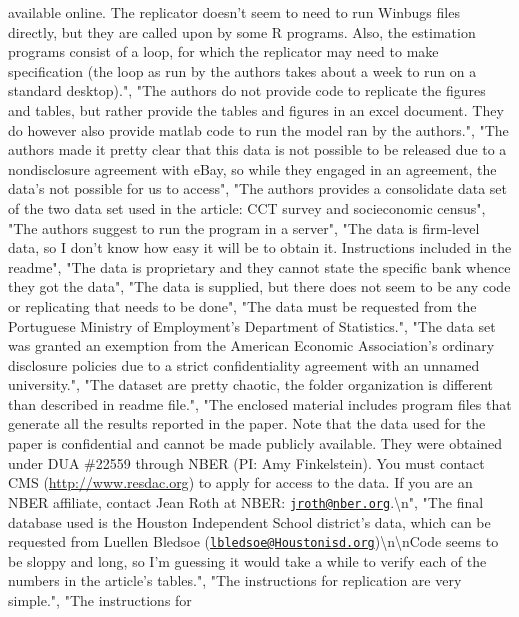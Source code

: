 \documentclass[]{article}
\begin{document}
\begin{itemize}
  available online. The replicator doesn't seem to need to run Winbugs
  files directly, but they are called upon by some R programs. Also, the
  estimation programs consist of a loop, for which the replicator may
  need to make specification (the loop as run by the authors takes about
  a week to run on a standard desktop).", "The authors do not provide
  code to replicate the figures and tables, but rather provide the
  tables and figures in an excel document. They do however also provide
  matlab code to run the model ran by the authors.", "The authors made
  it pretty clear that this data is not possible to be released due to a
  nondisclosure agreement with eBay, so while they engaged in an
  agreement, the data's not possible for us to access", "The authors
  provides a consolidate data set of the two data set used in the
  article: CCT survey and socieconomic census", "The authors suggest to
  run the program in a server", "The data is firm-level data, so I don't
  know how easy it will be to obtain it. Instructions included in the
  readme", "The data is proprietary and they cannot state the specific
  bank whence they got the data", "The data is supplied, but there does
  not seem to be any code or replicating that needs to be done", "The
  data must be requested from the Portuguese Ministry of Employment's
  Department of Statistics.", "The data set was granted an exemption
  from the American Economic Association's ordinary disclosure policies
  due to a strict confidentiality agreement with an unnamed
  university.", "The dataset are pretty chaotic, the folder organization
  is different than described in readme file.", "The enclosed material
  includes program files that generate all the results reported in the
  paper. Note that the data used for the paper is confidential and
  cannot be made publicly available. They were obtained under DUA
  \#22559 through NBER (PI: Amy Finkelstein). You must contact CMS
  (\url{http://www.resdac.org}) to apply for access to the data. If you
  are an NBER affiliate, contact Jean Roth at NBER:
  \href{mailto:jroth@nber.org}{\nolinkurl{jroth@nber.org}}.\textbackslash{}n",
  "The final database used is the Houston Independent School district's
  data, which can be requested from Luellen Bledsoe
  (\href{mailto:lbledsoe@Houstonisd.org}{\nolinkurl{lbledsoe@Houstonisd.org}})\textbackslash{}n\textbackslash{}nCode
  seems to be sloppy and long, so I'm guessing it would take a while to
  verify each of the numbers in the article's tables.", "The
  instructions for replication are very simple.", "The instructions for

\end{itemize}
\end{document}
